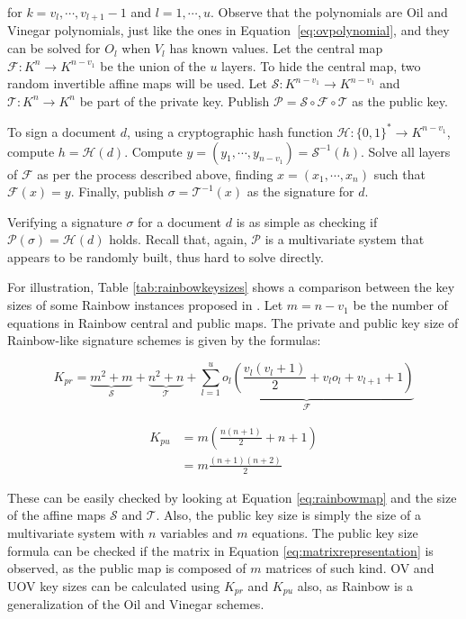 \documentclass{ufsctex/ufsctex}
\begin{document}
for $k = v_l, \cdots, v_{l+1} - 1$ and $l = 1, \cdots, u$. Observe that the
polynomials are Oil and Vinegar polynomials, just like the ones in
Equation~\ref{eq:ovpolynomial}, and they can be solved for $O_l$ when $V_l$ has
known values. Let the central map $\mathcal{F}:K^{n} \to K^{n-v_1}$ be the
union of the $u$ layers. To hide the central map, two random invertible affine
maps will be used. Let $\mathcal{S}:K^{n-v_1} \to K^{n-v_1}$ and
$\mathcal{T}:K^{n} \to K^{n}$ be part of the private key. Publish $\mathcal{P}
= \mathcal{S} \circ \mathcal{F} \circ \mathcal{T}$ as the public key.

To sign a document $d$, using a cryptographic hash function $\mathcal{H}:
\{0,1\}^* \to K^{n-v_1}$, compute $h = \mathcal{H}(d)$. Compute $y = (y_1,
\cdots, y_{n-v_1}) = \mathcal{S}^{-1}(h)$. Solve all layers of $\mathcal{F}$ as
per the process described above, finding $x = (x_1, \cdots, x_n)$ such that
$\mathcal{F}(x) = y$. Finally, publish $\sigma = \mathcal{T}^{-1}(x)$ as the
signature for $d$.

Verifying a signature $\sigma$ for a document $d$ is as simple as checking if
$\mathcal{P}(\sigma) = \mathcal{H}(d)$ holds. Recall that, again, $\mathcal{P}$
is a multivariate system that appears to be randomly built, thus hard to solve
directly.

For illustration, Table \ref{tab:rainbowkeysizes} shows a comparison between
the key sizes of some Rainbow instances proposed in \cite[Chapter
6]{petzoldt2013thesis}. Let $m = n - v_1$ be the number of equations in Rainbow
central and public maps. The private and public key size of Rainbow-like
signature schemes is given by the formulas:

\begin{equation}\label{eq:rainbowprivatekeysize}
K_{pr} =
\underbrace{m^2 + m}_{\mathcal{S}} + \underbrace{n^2 + n}_{\mathcal{T}} +
\underbrace{\sum_{l=1}^{u} o_l \left(
\frac{v_l(v_l + 1)}{2} + v_l o_l + v_{l+1} + 1
\right)}_{\mathcal{F}}
\end{equation}

\begin{equation}
\begin{split}
K_{pu} &= m \left( \frac{n (n + 1)}{2} + n + 1 \right) \\
&= m \frac{(n+1)(n+2)}{2}
\end{split}
\end{equation}

These can be easily checked by looking at Equation \ref{eq:rainbowmap} and the
size of the affine maps $\mathcal{S}$ and $\mathcal{T}$. Also, the public key
size is simply the size of a multivariate system with $n$ variables and $m$
equations. The public key size formula can be checked if the matrix in Equation
\ref{eq:matrixrepresentation} is observed, as the public map is composed of $m$
matrices of such kind. OV and UOV key sizes can be calculated using $K_{pr}$
and $K_{pu}$ also, as Rainbow is a generalization of the Oil and Vinegar
schemes.
\end{document}
